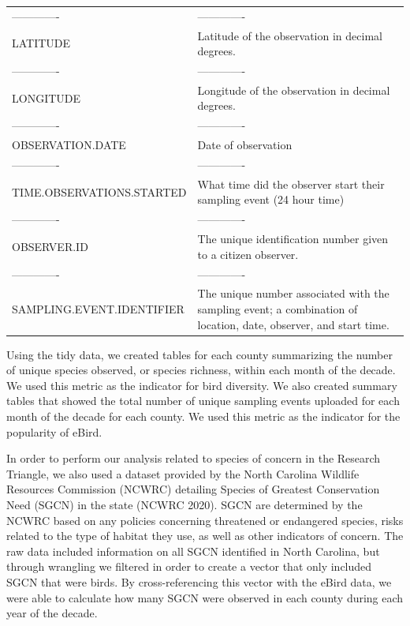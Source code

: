 \documentclass[
  12pt,
]{article}
\begin{document}
\begin{longtable}[]{@{}
  >{\raggedright\arraybackslash}p{}
  >{\raggedright\arraybackslash}p{}@{}}
------------- & ------------- \\
LATITUDE & Latitude of the observation in decimal degrees. \\
------------- & ------------- \\
LONGITUDE & Longitude of the observation in decimal degrees. \\
------------- & ------------- \\
OBSERVATION.DATE & Date of observation \\
------------- & ------------- \\
TIME.OBSERVATIONS.STARTED & What time did the observer start their
sampling event (24 hour time) \\
------------- & ------------- \\
OBSERVER.ID & The unique identification number given to a citizen
observer. \\
------------- & ------------- \\
SAMPLING.EVENT.IDENTIFIER & The unique number associated with the
sampling event; a combination of location, date, observer, and start
time. \\
\bottomrule
\end{longtable}

Using the tidy data, we created tables for each county summarizing the
number of unique species observed, or species richness, within each
month of the decade. We used this metric as the indicator for bird
diversity. We also created summary tables that showed the total number
of unique sampling events uploaded for each month of the decade for each
county. We used this metric as the indicator for the popularity of
eBird.

In order to perform our analysis related to species of concern in the
Research Triangle, we also used a dataset provided by the North Carolina
Wildlife Resources Commission (NCWRC) detailing Species of Greatest
Conservation Need (SGCN) in the state (NCWRC 2020). SGCN are determined
by the NCWRC based on any policies concerning threatened or endangered
species, risks related to the type of habitat they use, as well as other
indicators of concern. The raw data included information on all SGCN
identified in North Carolina, but through wrangling we filtered in order
to create a vector that only included SGCN that were birds. By
cross-referencing this vector with the eBird data, we were able to
calculate how many SGCN were observed in each county during each year of
the decade.

\newpage
\end{document}
